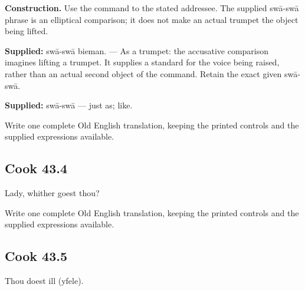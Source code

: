 \textbf{Construction.} Use the command to the stated addressee. The supplied swā-swā phrase is an elliptical comparison; it does not make an actual trumpet the object being lifted.

\textbf{Supplied:} swā-swā bieman. — As a trumpet: the accusative comparison imagines lifting a trumpet. It supplies a standard for the voice being raised, rather than an actual second object of the command. Retain the exact given swā-swā.

\textbf{Supplied:} swā-swā — just as; like.

Write one complete Old English translation, keeping the printed controls and the supplied expressions available.

\par\begin{minipage}{\linewidth}\raggedright
\subsection*{Cook 43.4}

Lady, whither goest thou?

Write one complete Old English translation, keeping the printed controls and the supplied expressions available.

\end{minipage}\par\addvspace{4pt}

\par\begin{minipage}{\linewidth}\raggedright
\subsection*{Cook 43.5}

Thou doest ill (yfele).

\end{minipage}\par\addvspace{4pt}

